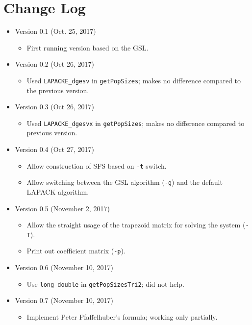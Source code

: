 \documentclass[a4paper, english]{article}
\newcommand{\ty}{\texttt}
\begin{document}
\section{Change Log}
\begin{itemize}
\item Version 0.1 (Oct. 25, 2017)
  \begin{itemize}
  \item First running version based on the GSL.
  \end{itemize}
\item Version 0.2 (Oct 26, 2017)
  \begin{itemize}
    \item Used \ty{LAPACKE\_dgesv} in \ty{getPopSizes}; makes no
      difference compared to the previous version.
  \end{itemize}
\item Version 0.3 (Oct 26, 2017)
  \begin{itemize}
    \item Used \ty{LAPACKE\_dgesvx} in \ty{getPopSizes}; makes no
      difference compared to previous version.
  \end{itemize}
\item Version 0.4 (Oct 27, 2017)
  \begin{itemize}
  \item Allow construction of SFS based on \ty{-t} switch.
  \item Allow switching between the GSL algorithm (\ty{-g}) and the
    default LAPACK algorithm. 
  \end{itemize}
\item Version 0.5 (November 2, 2017)
  \begin{itemize}
    \item Allow the straight usage of the trapezoid matrix for solving
      the system (\ty{-T}).
    \item Print out coefficient matrix (\ty{-p}).
  \end{itemize}
\item Version 0.6 (November 10, 2017)
  \begin{itemize}
  \item Use \ty{long double} in \ty{getPopSizesTri2}; did not help.
  \end{itemize}
\item Version 0.7 (November 10, 2017)
  \begin{itemize}
    \item Implement Peter Pfaffelhuber's formula; working only partially.
  \end{itemize}

\end{itemize}
\end{document}
